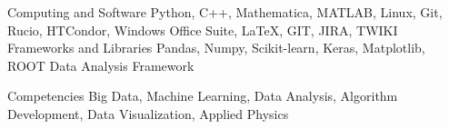 
\begin{cvskills}
  \cvskill
    {Computing and Software} %
    {Python, C++, Mathematica, MATLAB, Linux, Git, Rucio, HTCondor, Windows Office Suite, \LaTeX, GIT, JIRA, TWIKI} %
     \cvskill
    {Frameworks and Libraries} %
    {Pandas, Numpy, Scikit-learn, Keras, Matplotlib, ROOT Data Analysis Framework} %


  \cvskill
    {Competencies} %
    {Big Data, Machine Learning, Data Analysis, Algorithm Development, Data Visualization, Applied Physics} %

\end{cvskills}

